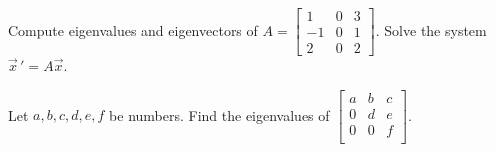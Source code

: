 \documentclass{ximera}
\begin{document}
\begin{exercise}%
    \begin{tasks}
        \task Compute eigenvalues and eigenvectors of
            $A= 
            \left[ 
                \begin{smallmatrix}
                    1 & 0 & 3 \\
                    -1 & 0 & 1 \\
                    2 & 0 & 2
                \end{smallmatrix}
            \right]$.
        \task Solve the system $\vec{x}\,' = A \vec{x}$.
    \end{tasks}
\end{exercise}

\begin{exercise}
    Let $a,b,c,d,e,f$ be numbers.  Find the eigenvalues of
    $\left[ 
        \begin{smallmatrix}
            a & b & c \\
            0 & d & e \\
            0 & 0 & f \\
        \end{smallmatrix} 
    \right]$.
\end{exercise}
\end{document}
